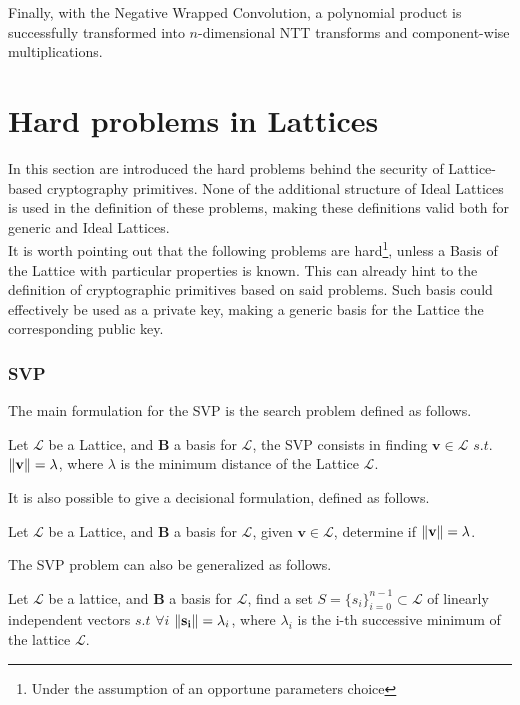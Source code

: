 Finally, with the Negative Wrapped Convolution, a polynomial product is successfully transformed into $n$-dimensional NTT transforms and component-wise multiplications.

\section{Hard problems in Lattices}\label{sec:bg:prob}
In this section are introduced the hard problems behind the security of Lattice-based cryptography primitives. None of the additional structure of Ideal Lattices is used in the definition of these problems, making these definitions valid both for generic and Ideal Lattices.\\
It is worth pointing out that the following problems are hard\footnote{Under the assumption of an opportune parameters choice}, unless a Basis of the Lattice with particular properties is known. This can already hint to the definition of cryptographic primitives based on said problems. Such basis could effectively be used as a private key, making a generic basis for the Lattice the corresponding public key.

\subsubsection{SVP}

The main formulation for the SVP is the search problem defined as follows.

\begin{definition}
Let $\mathscr{L}$ be a Lattice, and $\mathbf{B}$ a basis for $\mathscr{L}$, the SVP consists in finding $\mathbf{v}\in\mathscr{L}$ $s.t.$ $\left\lVert \mathbf{v} \right\rVert = \lambda$, where $\lambda$ is the minimum distance of the Lattice $\mathscr{L}$.
\end{definition}

It is also possible to give a decisional formulation, defined as follows.

\begin{definition}
Let $\mathscr{L}$ be a Lattice, and $\mathbf{B}$ a basis for $\mathscr{L}$, given $\mathbf{v}\in\mathscr{L}$, determine if $\left\lVert \mathbf{v} \right\rVert = \lambda$.
\end{definition}

The SVP problem can also be generalized as follows.

\begin{definition}
Let $\mathscr{L}$ be a lattice, and $\mathbf{B}$ a basis for $\mathscr{L}$, find a set $S=\{s_i\}_{i=0}^{n-1}\subset \mathscr{L}$ of linearly independent vectors $s.t$ $\forall i$ $\left\lVert \mathbf{s_i} \right\rVert = \lambda_i$, where $\lambda_i$ is the i-th successive minimum of the lattice $\mathscr{L}$.
\end{definition}

